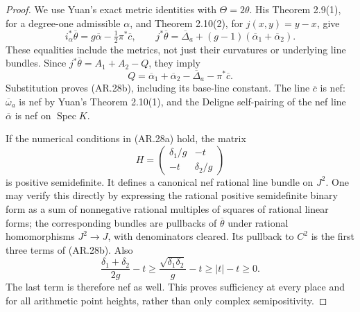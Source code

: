\begin{proof}
We use Yuan's exact metric identities with $\Theta=2\theta$.
His Theorem 2.9(1), for a degree-one admissible $\alpha$, and
Theorem 2.10(2), for $j(x,y)=y-x$, give
\[
 i_\alpha^*\overline\theta
       =g\overline\alpha-\tfrac12\pi^*\overline c,
 \qquad
 j^*\overline\theta
       =\overline\Delta_a+(g-1)
                    (\overline\alpha_1+\overline\alpha_2).
                                                               \tag{AR.28c}
\]
These equalities include the metrics, not just their curvatures or
underlying line bundles.  Since
$j^*\overline\theta=A_1+A_2-Q$, they imply
\[
 Q=\overline\alpha_1+\overline\alpha_2
                  -\overline\Delta_a-\pi^*\overline c.
\]
Substitution proves (AR.28b), including its base-line constant.
The line $\overline c$ is nef: $\overline\omega_a$ is nef by
Yuan's Theorem 2.10(1), and the Deligne self-pairing of the nef
line $\overline\alpha$ is nef on $\operatorname{Spec}K$.

If the numerical conditions in (AR.28a) hold, the matrix
\[
 H=\begin{pmatrix}\delta_1/g&-t\\-t&\delta_2/g\end{pmatrix}
\]
is positive semidefinite.  It defines a canonical nef rational
line bundle on $J^2$.  One may verify this directly by expressing
the rational positive semidefinite binary form as a sum of
nonnegative rational multiples of squares of rational linear
forms; the corresponding bundles are pullbacks of
$\overline\theta$ under rational homomorphisms $J^2\to J$,
with denominators cleared.  Its pullback to $C^2$ is the first
three terms of (AR.28b).  Also
\[
 \frac{\delta_1+\delta_2}{2g}-t
       \ge\frac{\sqrt{\delta_1\delta_2}}{g}-t
       \ge |t|-t\ge0.
\]
The last term is therefore nef as well.  This proves sufficiency
at every place and for all arithmetic point heights, rather than
only complex semipositivity.


\end{proof}
